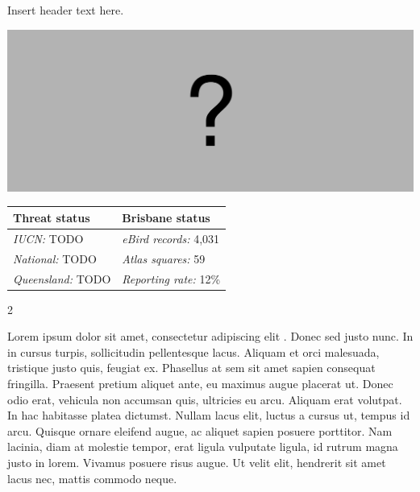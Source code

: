 \documentclass[12pt,openany,oneside]{book}
\let\origfigure\figure
\let\endorigfigure\endfigure
\renewenvironment{figure}[1][2] {
  \expandafter\origfigure\expandafter[H]
} {
  \endorigfigure
}
\let\Begin\begin
\let\End\end
\theoremstyle{definition}
\theoremstyle{definition}
\theoremstyle{definition}
\theoremstyle{remark}
\begin{document}

Insert header text here.

\begin{figure}
\centering
\includegraphics[width=\textwidth,keepaspectratio=true]{assets/misc/missing-profile.png}
\caption{Insert caption here.}
\end{figure}

\begin{tabu} to 
\toprule
Threat status & Brisbane status\\
\midrule
\textit{IUCN:} TODO & \textit{eBird records:} 4,031\\
\textit{National:} TODO & \textit{Atlas squares:} 59\\
\textit{Queensland:} TODO & \textit{Reporting rate:} 12\%\\
\bottomrule
\end{tabu} 
\vspace{0.15cm}

\Begin{multicols}{2}

Lorem ipsum dolor sit amet, consectetur adipiscing elit
\citep{rexample1, rexample2, rexample3}. Donec sed justo nunc. In in
cursus turpis, sollicitudin pellentesque lacus. Aliquam et orci
malesuada, tristique justo quis, feugiat ex. Phasellus at sem sit amet
sapien consequat fringilla. Praesent pretium aliquet ante, eu maximus
augue placerat ut. Donec odio erat, vehicula non accumsan quis,
ultricies eu arcu. Aliquam erat volutpat. In hac habitasse platea
dictumst. Nullam lacus elit, luctus a cursus ut, tempus id arcu. Quisque
ornare eleifend augue, ac aliquet sapien posuere porttitor. Nam lacinia,
diam at molestie tempor, erat ligula vulputate ligula, id rutrum magna
justo in lorem. Vivamus posuere risus augue. Ut velit elit, hendrerit
sit amet lacus nec, mattis commodo neque.

\End{multicols}

\clearpage
\end{document}
